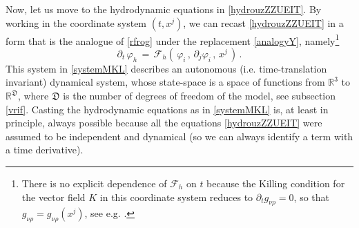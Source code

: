 \documentclass[a4paper, amsfonts, amssymb, amsmath, reprint, twocolumn, showkeys, nofootinbib]{revtex4-2}
\begin{document}
Now, let us move to  the hydrodynamic equations in \eqref{hydrouzZZUEIT}. By working in the coordinate system $(t,x^j)$, we can recast \eqref{hydrouzZZUEIT} in a form that is the analogue of \eqref{rfrog} under the replacement \eqref{analogyY}, namely\footnote{
There is no explicit dependence of $\mathcal{F}_h$ on $t$ because the Killing condition for the vector field $K$ in this coordinate system reduces to $\partial_t g_{\nu \rho}=0 $, so that $g_{\nu \rho}=g_{\nu \rho}(x^j)$, see e.g.  \cite{carroll_2019}.
}
\begin{equation}\label{systemMKL}
\partial_t \, \varphi_h \, = \, 
\mathcal{F}_h ( \, \varphi_i \,  , \,  \partial_j \varphi_i  \,  ,  \,  x^j \, ) \, .
\end{equation}
This system in \eqref{systemMKL} describes an autonomous (i.e. time-translation invariant) dynamical system, whose state-space is a space of functions from $\mathbb{R}^3$ to $\mathbb{R}^\mathfrak{D}$, where $\mathfrak{D}$ is the number of degrees of freedom of the model, see subsection \eqref{vrif}. 
Casting the hydrodynamic equations  as in \eqref{systemMKL} is, at least in principle, always possible because all the equations \eqref{hydrouzZZUEIT} were assumed to be independent and dynamical (so we can always identify a term with a time derivative).
\end{document}
